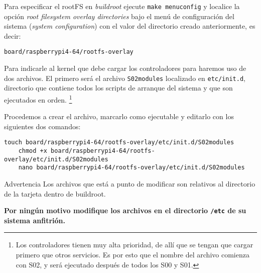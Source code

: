 Para especificar el rootFS en \emph{buildroot} ejecute \texttt{make menuconfig} y localice la opción \emph{root filesystem overlay directories} bajo el menú de configuración del sistema (\emph{system configuration}) con el valor del directorio creado anteriormente, es decir:

\begin{Verbatim}[gobble=1]
	board/raspberrypi4-64/rootfs-overlay
\end{Verbatim}

Para indicarle al kernel que debe cargar los controladores para \IIC{} haremos uso de dos archivos.
El primero será el archivo \texttt{S02modules} localizado en \texttt{etc/init.d}, directorio que contiene todos los scripts de arranque del sistema y que son ejecutados en orden.%
\footnote{
	Los controladores tienen muy alta prioridad, de allí que se tengan que cargar primero que otros servicios.
	Es por esto que el nombre del archivo comienza con S02, y será ejecutado después de todos los S00 y S01.
}
\begin{samepage}
Procedemos a crear el archivo, marcarlo como ejecutable y editarlo con los siguientes dos comandos:

\begin{Verbatim}[gobble=1]
	touch board/raspberrypi4-64/rootfs-overlay/etc/init.d/S02modules
	chmod +x board/raspberrypi4-64/rootfs-overlay/etc/init.d/S02modules
	nano board/raspberrypi4-64/rootfs-overlay/etc/init.d/S02modules
\end{Verbatim}
\end{samepage}

\medskip{}

\begin{importantbox}{Advertencia}
	Los archivos que está a punto de modificar son relativos al directorio de la tarjeta dentro de buildroot.

	\medskip\bfseries
	Por ningún motivo modifique los archivos en el directorio \texttt{/etc} de su sistema anfitrión.
\end{importantbox}

\medskip{}

